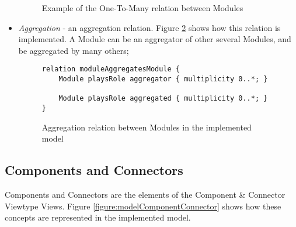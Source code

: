 \begin{itemize}
\begin{figure}[h]
\caption{Example of the One-To-Many relation between Modules}
\label{figure:modelOneToManyExample}
\end{figure}

\item \textit{Aggregation} - an aggregation relation. Figure \ref{figure:modelAggregationRelation} shows how this relation is implemented. A Module can be an aggregator of other several Modules, and be aggregated by many others;

\begin{figure}[h]
\centering
\lstset{style=customjava}
\begin{lstlisting}
relation moduleAggregatesModule {
	Module playsRole aggregator { multiplicity 0..*; }
	
	Module playsRole aggregated { multiplicity 0..*; }
}
\end{lstlisting}
\caption{Aggregation relation between Modules in the implemented model}
\label{figure:modelAggregationRelation}
\end{figure}

\end{itemize}

\subsection{Components and Connectors}
\label{subsection:modelComponentsConnectors}
Components and Connectors are the elements of the Component \& Connector Viewtype Views. Figure \ref{figure:modelComponentConnector} shows how these concepts are represented in the implemented model.

